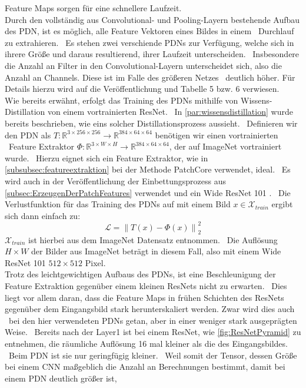 Feature Maps sorgen für eine schnellere Laufzeit.\\
Durch den vollständig aus Convolutional- und Pooling-Layern bestehende Aufbau des PDN, ist es möglich, alle Feature Vektoren eines Bildes in einem \
Durchlauf zu extrahieren. \
Es stehen zwei verschiende PDNs zur Verfügung, welche sich in ihrere Größe und daraus resultierend, ihrer Laufzeit unterscheiden. \
Insbesondere die Anzahl an Filter in den Convolutional-Layern unterscheidet sich, also die Anzahl an Channels. Diese ist im Falle des größeren Netzes \
deutlich höher. Für Details hierzu wird auf die Veröffentlichung \cite{efficientad} und Tabelle 5 bzw. 6 verwiesen. \\
Wie bereits erwähnt, erfolgt das Training des PDNs mithilfe von Wissens-Distillation von einem vortrainierten ResNet. \
In \ref{par:wissensdistillation} wurde bereits beschrieben, wie eins solcher Distillationsprozess aussieht. \
Definieren wir den PDN als $T:\mathbb{R}^{3\times 256\times 256}\rightarrow \mathbb{R}^{384\times 64\times 64}$ benötigen wir einen vortrainierten \
Feature Extraktor $\Phi:\mathbb{R}^{3\times W\times H}\rightarrow \mathbb{R}^{384 \times 64\times 64}$, der auf ImageNet vortrainiert wurde. \
Hierzu eignet sich ein Feature Extraktor, wie in \ref{subsubsec:featureextraktion} bei der Methode PatchCore verwendet, ideal. \
Es wird auch in der Veröffentlichung der Einbettungsprozess aus \ref{subsec:ErzeugenDerPatchFeatures} verwendet und ein Wide ResNet 101 \cite{wideresnet}. \
Die Verlustfunktion für das Training des PDNs auf mit einem Bild $x\in\mathcal{X}_{train}$ ergibt sich dann einfach zu: \
$$
\mathcal{L}= \left\lVert T(x)-\Phi(x) \right\rVert_{2}^{2}
$$
$\mathcal{X}_{train}$ ist hierbei aus dem ImageNet Datensatz entnommen. \ 
Die Auflösung $H \times W$ der Bilder aus ImageNet beträgt in diesem Fall, also mit einem Wide ResNet 101 $512\times 512$ Pixel. \\
Trotz des leichtgewichtigen Aufbaus des PDNs, ist eine Beschleunigung der Feature Extraktion gegenüber einem kleinen ResNets nicht zu erwarten. \
Dies liegt vor allem daran, dass die Feature Maps in frühen Schichten des ResNets gegenüber dem Eingangsbild stark herunterskaliert werden. Zwar wird dies auch \
bei den hier verwendeten PDNs getan, aber in einer weniger stark ausgeprägten Weise. \
Bereits nach der \glqq Layer1\grqq{} ist bei einem ResNet, wie \ref{fig:ResNetPyramid} zu entnehmen, die räumliche Auflösung 16 mal kleiner als die des Eingangsbildes. \
Beim PDN ist sie nur geringfügig kleiner. \
Weil somit der Tensor, dessen Größe bei einem CNN maßgeblich die Anzahl an Berechnungen bestimmt, damit bei einem PDN deutlich größer ist, \
